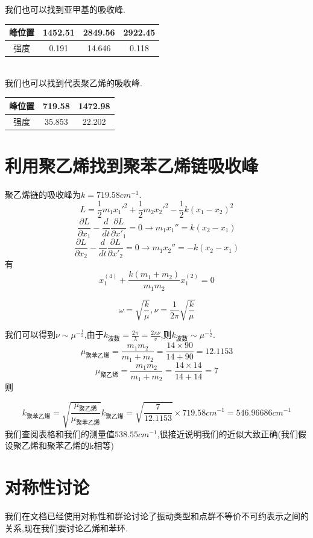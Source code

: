 \documentclass[10pt, a4paper]{article}
\begin{document}
    我们也可以找到亚甲基的吸收峰.\\
    
    \begin{tabular}{|c|c|c|c|}
    	\hline
    	峰位置& 1452.51 & 2849.56 & 2922.45  \\
    	\hline
    	强度& 0.191 & 14.646 & 0.118  \\
    	\hline
    \end{tabular}\\
    
    我们也可以找到代表聚乙烯的吸收峰.\\
    
    \begin{tabular}{|c|c|c|}
    	\hline
    	峰位置&  719.58&1472.98 \\
    	\hline
    	强度& 35.853&22.202 \\
    	\hline
    \end{tabular}
    \section{利用聚乙烯找到聚苯乙烯链吸收峰}
    聚乙烯链的吸收峰为$k = 719.58cm^{-1}$.
    \[L = \frac{1}{2}m_1x_1'^2+\frac{1}{2}m_2x_2'^2-\frac{1}{2}k(x_1-x_2)^2\]
    \[\frac{\partial L}{\partial x_1}-\frac{d}{dt}\frac{\partial L}{\partial x'_1}=0\rightarrow m_1x_1''=k(x_2-x_1) \]
    \[\frac{\partial L}{\partial x_2}-\frac{d}{dt}\frac{\partial L}{\partial x'_2}=0\rightarrow m_1x_2''=-k(x_2-x_1) \]
    有\[x_1^{(4)}+\frac{k(m_1+m_2)}{m_1m_2}x_1^{(2)}=0\]
    
    \[\omega = \sqrt{\frac{k}{\mu}},\nu=\frac{1}{2\pi}\sqrt{\frac{k}{\mu}}\]
    
    我们可以得到$\nu\sim\mu^{-\frac{1}{2}}$,由于$k_\text{波数}=\frac{2\pi}{\lambda}=\frac{2\pi\nu}{v}$,则$k_\text{波数}\sim\mu^{-\frac{1}{2}}$.\\
    
    \[\mu_\text{聚苯乙烯} = \frac{m_1m_2}{m_1+m_2} = \frac{14\times90}{14+90} = 12.1153\]
    \[\mu_\text{聚乙烯} = \frac{m_1m_2}{m_1+m_2} = \frac{14\times14}{14+14} = 7\]
    则
    
    \[k_{\text{聚苯乙烯}} = \sqrt{\frac{\mu_{\text{聚乙烯}} }{\mu_{\text{聚苯乙烯}}}}k_{\text{聚乙烯}}=\sqrt{\frac{7}{12.1153}}\times719.58cm^{-1} = 546.96686cm^{-1}\]
    我们查阅表格和我们的测量值$538.55cm^{-1}$,很接近说明我们的近似大致正确(我们假设聚乙烯和聚苯乙烯的k相等)
    \section{对称性讨论}
    我们在文档已经使用对称性和群论讨论了振动类型和点群不等价不可约表示之间的关系,现在我们要讨论乙烯和苯环.
\end{document}
